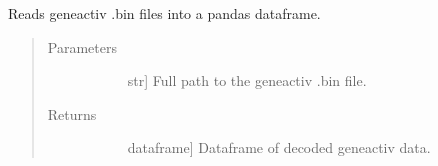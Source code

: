 \documentclass[letterpaper,10pt,english]{sphinxmanual}
\begin{document}

\begin{fulllineitems}
\label{\detokenize{index:sleeppy.utils.bin2df}}
Reads geneactiv .bin files into a pandas dataframe.
\begin{quote}\begin{description}
\item[{Parameters}] \leavevmode\begin{description}
\item[{}] \leavevmode{[}str{]}
Full path to the geneactiv .bin file.

\end{description}

\item[{Returns}] \leavevmode\begin{description}
\item[{}] \leavevmode{[}dataframe{]}
Dataframe of decoded geneactiv data.

\end{description}

\end{description}\end{quote}

\end{fulllineitems}

\end{document}
